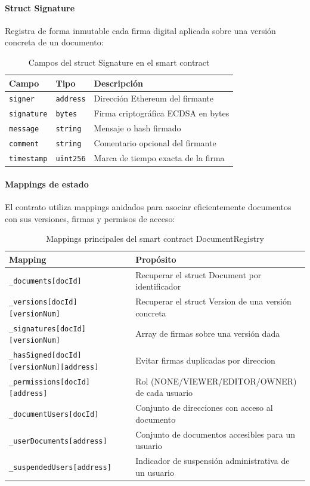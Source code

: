 \documentclass[11pt, a4paper]{article}
\begin{document}
\paragraph{Struct Signature}

Registra de forma inmutable cada firma digital aplicada sobre una versión concreta de un documento:

\begin{table}[H]
\centering
\begin{tabular}{|l|l|p{7cm}|}
\hline
\textbf{Campo} & \textbf{Tipo} & \textbf{Descripción} \\
\hline
\texttt{signer} & \texttt{address} & Dirección Ethereum del firmante \\
\hline
\texttt{signature} & \texttt{bytes} & Firma criptográfica ECDSA en bytes \\
\hline
\texttt{message} & \texttt{string} & Mensaje o hash firmado \\
\hline
\texttt{comment} & \texttt{string} & Comentario opcional del firmante \\
\hline
\texttt{timestamp} & \texttt{uint256} & Marca de tiempo exacta de la firma \\
\hline
\end{tabular}
\caption{Campos del struct Signature en el smart contract}
\end{table}

\paragraph{Mappings de estado}

El contrato utiliza mappings anidados para asociar eficientemente documentos con sus versiones, firmas y permisos de acceso:

\begin{table}[H]
\centering
\small
\begin{tabular}{|p{6cm}|p{8cm}|}
\hline
\textbf{Mapping} & \textbf{Propósito} \\
\hline
\texttt{\_documents[docId]} & Recuperar el struct Document por identificador \\
\hline
\texttt{\_versions[docId][versionNum]} & Recuperar el struct Version de una versión concreta \\
\hline
\texttt{\_signatures[docId][versionNum]} & Array de firmas sobre una versión dada \\
\hline
\texttt{\_hasSigned[docId][versionNum][address]} & Evitar firmas duplicadas por direccion \\
\hline
\texttt{\_permissions[docId][address]} & Rol (NONE/VIEWER/EDITOR/OWNER) de cada usuario \\
\hline
\texttt{\_documentUsers[docId]} & Conjunto de direcciones con acceso al documento \\
\hline
\texttt{\_userDocuments[address]} & Conjunto de documentos accesibles para un usuario \\
\hline
\texttt{\_suspendedUsers[address]} & Indicador de suspensión administrativa de un usuario \\
\hline
\end{tabular}
\caption{Mappings principales del smart contract DocumentRegistry}
\end{table}
\end{document}
